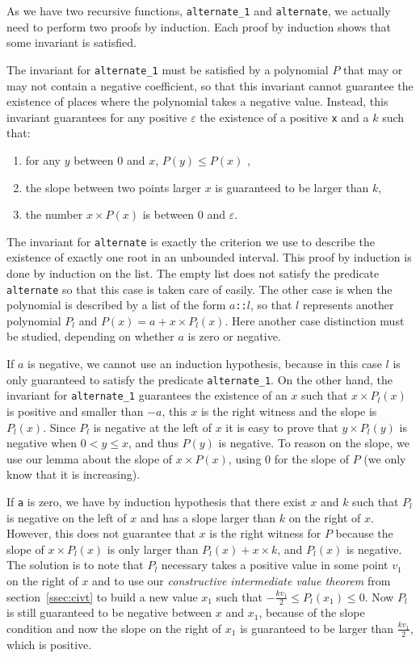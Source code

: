 \documentclass{mscs}
\begin{document}
As we have two recursive functions, {\tt alternate\_1} and {\tt alternate},
we actually need to perform two proofs by induction.  Each proof by induction
shows that some invariant is satisfied.

The invariant for {\tt alternate\_1}
must be satisfied by a polynomial \(P\) that may or may not contain a negative
coefficient, so that this invariant cannot guarantee the existence of
places where the polynomial takes a negative value.  Instead, this invariant
guarantees for any positive \(\varepsilon\) the existence of a positive {\tt x}
and a \(k\) such that:
\begin{enumerate}
\item for any \(y\) between \(0\) and \(x\), \(P(y) \leq P (x)\) ,
\item the slope between two points larger \(x\) is guaranteed to be larger
than \(k\),
\item the number \(x \times P(x)\) is between \(0\) and \(\varepsilon\).
\end{enumerate}

The invariant for {\tt alternate} is exactly the criterion we use
to describe the existence of exactly one root in an unbounded interval.
This proof by induction is done by induction on the list.  The empty list
does not satisfy the predicate {\tt alternate} so that this case is
taken care of easily.  The other case is when the polynomial is described
by a list of the form {\tt \(a\)::\(l\)}, so that \(l\) represents another polynomial
\(P_l\) and \(P(x) = a + x \times P_l(x)\).  Here another case distinction must be
studied, depending on whether \(a\) is zero or negative.

If \(a\) is negative, we cannot use an induction hypothesis, because in
this case \(l\) is only guaranteed to satisfy the predicate
{\tt alternate\_1}.  On the other hand, the invariant for {\tt alternate\_1}
guarantees the existence of an \(x\) such that \(x\times P_l(x)\) is positive
and smaller than \(-a\), this \(x\) is the right witness and the slope is
\(P_l(x)\).  Since \(P_l\) is negative at the left of \(x\) it is easy to
prove that \(y\times P_l(y)\) is negative when \(0 < y \leq x\), and thus
\(P(y)\) is negative.  To reason on the slope, we use our lemma about the
slope of \(x \times P(x)\), using \(0\) for the slope of \(P\) (we only
know that it is increasing).

If {\tt a} is
zero, we have by induction hypothesis that there exist \(x\) and \(k\)
such that \(P_l\) is negative on the left of \(x\) and has a slope larger than
\(k\) on the right of \(x\).  However, this does not guarantee that \(x\) is
the right witness for \(P\) because the slope of \(x\times P_l(x)\) is only
larger than \(P_l(x) + x \times k\), and \(P_l(x)\) is negative.  The solution
is to note that \(P_l\) necessary takes a positive value in some point \(v_1\)
on the right of \(x\) and to use our
{\em constructive intermediate value theorem} from
section~\ref{ssec:civt} to
build a new value \(x_1\) such that \(-\frac{k v_1}{2} \leq P_l(x_1) \leq 0\).
Now \(P_l\) is still guaranteed to be negative between \(x\) and \(x_1\),
because of the slope condition and now the slope on the right of \(x_1\) is
guaranteed to be larger than \(\frac{k v_1}{2}\), which is positive.
\end{document}
